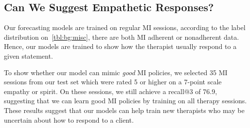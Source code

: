 \subsection{Can We Suggest Empathetic Responses?}
\label{ssec:sentence:good-MI}

Our forecasting models are trained on regular MI sessions, according
to the label distribution on~\autoref{tbl:bg:misc}, there are both MI
adherent or nonadherent data. Hence, our models are trained to show
how the therapist usually respond to a given statement.

To show whether our model can mimic {\em good} MI policies, we
selected 35 MI sessions from our test set which were rated 5 or
higher on a 7-point scale empathy or spirit. On these sessions, we
still achieve a recall@3 of 76.9, suggesting that we can learn good
MI policies by training on all therapy sessions. These results
suggest that our models can help train new
therapists who may be uncertain about how to respond to a client.




